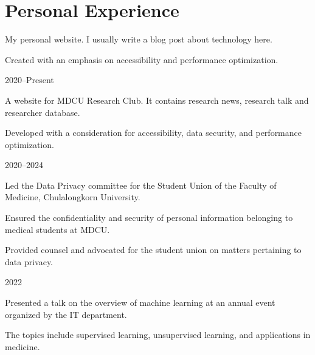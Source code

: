 \documentclass{cv}
\begin{document}
\section{Personal Experience}
\begin{cv_table}
  {\begin{cv_itemize}
      \item My personal website. I usually write a blog post about technology here.
      \item Created with an emphasis on accessibility and performance optimization.
    \end{cv_itemize}
  }{}{2020--Present}
  {\begin{cv_itemize}
      \item A website for MDCU Research Club. It contains research news, research talk and researcher database.
      \item Developed with a consideration for accessibility, data security, and performance optimization.
    \end{cv_itemize}
  }{}{2020--2024}
  {\begin{cv_itemize}
      \item Led the Data Privacy committee for the Student Union of the Faculty of Medicine, Chulalongkorn University.
      \item Ensured the confidentiality and security of personal information belonging to medical students at MDCU.
      \item Provided counsel and advocated for the student union on matters pertaining to data privacy.
    \end{cv_itemize}
  }{}{2022}
  {\begin{cv_itemize}
      \item Presented a talk on the overview of machine learning at an annual event organized by the IT department.
      \item The topics include supervised learning, unsupervised learning, and applications in medicine.
    \end{cv_itemize}
}
\end{cv_table}
\end{document}
